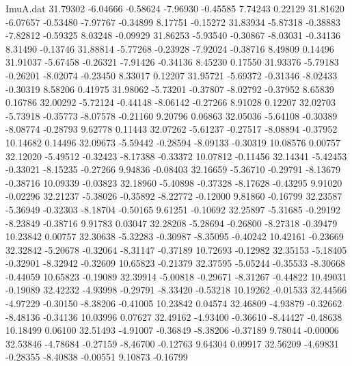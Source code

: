 \begin{filecontents}{ImuA.dat}
  31.79302   -6.04666   -0.58624   -7.96930   -0.45585    7.74243    0.22129
  31.81620   -6.07657   -0.53480   -7.97767   -0.34899    8.17751   -0.15272
  31.83934   -5.87318   -0.38883   -7.82812   -0.59325    8.03248   -0.09929
  31.86253   -5.93540   -0.30867   -8.03031   -0.34136    8.31490   -0.13746
  31.88814   -5.77268   -0.23928   -7.92024   -0.38716    8.49809    0.14496
  31.91037   -5.67458   -0.26321   -7.91426   -0.34136    8.45230    0.17550
  31.93376   -5.79183   -0.26201   -8.02074   -0.23450    8.33017    0.12207
  31.95721   -5.69372   -0.31346   -8.02433   -0.30319    8.58206    0.41975
  31.98062   -5.73201   -0.37807   -8.02792   -0.37952    8.65839    0.16786
  32.00292   -5.72124   -0.44148   -8.06142   -0.27266    8.91028    0.12207
  32.02703   -5.73918   -0.35773   -8.07578   -0.21160    9.20796    0.06863
  32.05036   -5.64108   -0.30389   -8.08774   -0.28793    9.62778    0.11443
  32.07262   -5.61237   -0.27517   -8.08894   -0.37952   10.14682    0.14496
  32.09673   -5.59442   -0.28594   -8.09133   -0.30319   10.08576    0.00757
  32.12020   -5.49512   -0.32423   -8.17388   -0.33372   10.07812   -0.11456
  32.14341   -5.42453   -0.33021   -8.15235   -0.27266    9.94836   -0.08403
  32.16659   -5.36710   -0.29791   -8.13679   -0.38716   10.09339   -0.03823
  32.18960   -5.40898   -0.37328   -8.17628   -0.43295    9.91020   -0.02296
  32.21237   -5.38026   -0.35892   -8.22772   -0.12000    9.81860   -0.16799
  32.23587   -5.36949   -0.32303   -8.18704   -0.50165    9.61251   -0.10692
  32.25897   -5.31685   -0.29192   -8.23849   -0.38716    9.91783    0.03047
  32.28208   -5.28694   -0.26800   -8.27318   -0.39479   10.23842    0.00757
  32.30638   -5.32283   -0.30987   -8.35095   -0.40242   10.42161   -0.23669
  32.32842   -5.20678   -0.32064   -8.31147   -0.37189   10.72693   -0.12982
  32.35153   -5.18405   -0.32901   -8.32942   -0.32609   10.65823   -0.21379
  32.37595   -5.05244   -0.35533   -8.30668   -0.44059   10.65823   -0.19089
  32.39914   -5.00818   -0.29671   -8.31267   -0.44822   10.49031   -0.19089
  32.42232   -4.93998   -0.29791   -8.33420   -0.53218   10.19262   -0.01533
  32.44566   -4.97229   -0.30150   -8.38206   -0.41005   10.23842    0.04574
  32.46809   -4.93879   -0.32662   -8.48136   -0.34136   10.03996    0.07627
  32.49162   -4.93400   -0.36610   -8.44427   -0.48638   10.18499    0.06100
  32.51493   -4.91007   -0.36849   -8.38206   -0.37189    9.78044   -0.00006
  32.53846   -4.78684   -0.27159   -8.46700   -0.12763    9.64304    0.09917
  32.56209   -4.69831   -0.28355   -8.40838   -0.00551    9.10873   -0.16799

\end{filecontents}
